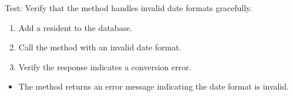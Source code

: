 \documentclass[letterpaper,10pt,english]{sphinxmanual}
\begin{document}
\begin{fulllineitems}
\label{\detokenize{test:test.test_residetnt.test_update_resident_birthdate_invalid_format}}
\pysigstartsignatures
\pysiglinewithargsret
{}
{}
{}
\pysigstopsignatures
\sphinxAtStartPar
Test: Verify that the method handles invalid date formats gracefully.
\begin{description}
\begin{enumerate}
%
\item {} 
\sphinxAtStartPar
Add a resident to the database.

\item {} 
\sphinxAtStartPar
Call the  method with an invalid date format.

\item {} 
\sphinxAtStartPar
Verify the response indicates a conversion error.

\end{enumerate}

\begin{itemize}
\item {} 
\sphinxAtStartPar
The method returns an error message indicating the date format is invalid.

\end{itemize}

\end{description}

\end{fulllineitems}

\end{document}
